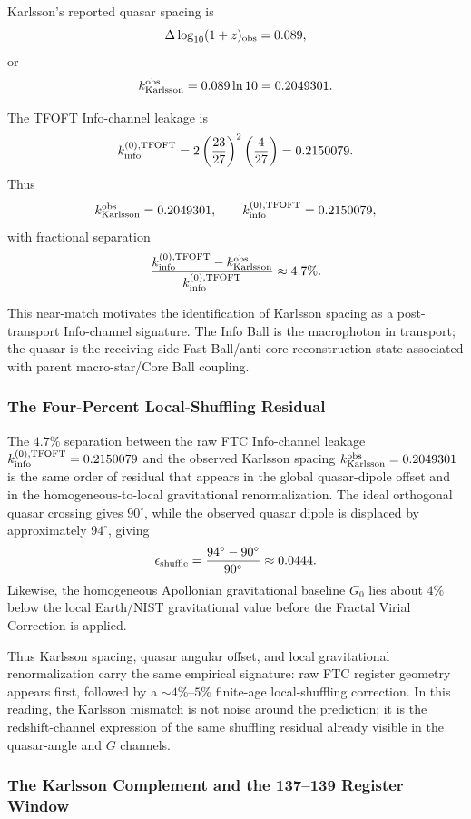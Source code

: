 \documentclass[11pt,a4paper]{article}
\begin{document}
Karlsson's reported quasar spacing is
\[
\Delta\log_{10}(1+z)_{\rm obs}=0.089,
\]
or
\[
k_{\rm Karlsson}^{\rm obs}
=
0.089\ln 10
=
0.2049301.
\]

The TFOFT Info-channel leakage is
\[
k_{\rm info}^{(0),{\rm TFOFT}}
=
2\left(\frac{23}{27}\right)^2\left(\frac{4}{27}\right)
=
0.2150079.
\]
Thus
\[
k_{\rm Karlsson}^{\rm obs}=0.2049301,
\qquad
k_{\rm info}^{(0),{\rm TFOFT}}=0.2150079,
\]
with fractional separation
\[
\frac{
k_{\rm info}^{(0),{\rm TFOFT}}-k_{\rm Karlsson}^{\rm obs}
}{
k_{\rm info}^{(0),{\rm TFOFT}}
}
\approx
4.7\%.
\]

This near-match motivates the identification of Karlsson spacing as a
post-transport Info-channel signature. The Info Ball is the macrophoton in
transport; the quasar is the receiving-side Fast-Ball/anti-core reconstruction
state associated with parent macro-star/Core Ball coupling.

\subsubsection{The Four-Percent Local-Shuffling Residual}
\label{sec:four_percent_residual}

The \(4.7\%\) separation between the raw FTC Info-channel leakage
\(k_{\rm info}^{(0),{\rm TFOFT}}=0.2150079\) and the observed Karlsson spacing
\(k_{\rm Karlsson}^{\rm obs}=0.2049301\) is the same order of residual that appears in the global quasar-dipole offset and in the homogeneous-to-local gravitational renormalization. The ideal orthogonal quasar crossing gives \(90^\circ\), while the observed quasar dipole is displaced by approximately \(94^\circ\), giving
\[
\epsilon_{\rm shuffle}
=
\frac{94^\circ-90^\circ}{90^\circ}
\approx
0.0444.
\]
Likewise, the homogeneous Apollonian gravitational baseline \(G_0\) lies about \(4\%\) below the local Earth/NIST gravitational value before the Fractal Virial Correction is applied.

Thus Karlsson spacing, quasar angular offset, and local gravitational renormalization carry the same empirical signature: raw FTC register geometry appears first, followed by a \(\sim4\%\)--\(5\%\) finite-age local-shuffling correction. In this reading, the Karlsson mismatch is not noise around the prediction; it is the redshift-channel expression of the same shuffling residual already visible in the quasar-angle and \(G\) channels.

\subsubsection{The Karlsson Complement and the 137--139 Register Window}
\end{document}
